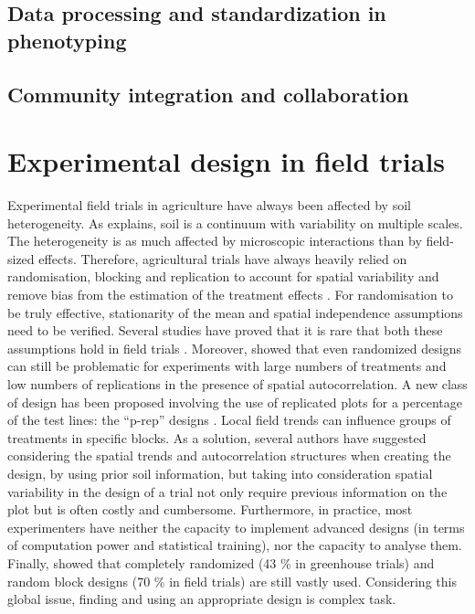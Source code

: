 \subsection{Data processing and standardization in phenotyping}
\subsection{Community integration and collaboration}


\section{Experimental design in field trials}
Experimental field trials in agriculture have always been affected by soil heterogeneity. As \textcite{van_es_1.2_2002} explains, soil is a continuum with variability on multiple scales. 
The heterogeneity is as much affected by microscopic interactions than by field-sized effects. 
Therefore, agricultural trials have always heavily relied on randomisation, blocking and replication to account for spatial variability and remove bias from the estimation of the treatment effects \parencite{atkinson_one_2001}. 
For randomisation to be truly effective, stationarity of the mean and spatial independence assumptions need to be verified. Several studies have proved that it is rare that both these assumptions hold in field trials \parencite{davidoff_method_1986,nielsen_spatial_1973,iqbal_spatial_2005}. 
Moreover, \textcite{van_es_spatial_1993} showed that even randomized designs can still be problematic for experiments with large numbers of treatments and low numbers of replications in the presence of spatial autocorrelation. A new class of design has been proposed involving the use of replicated plots for a percentage of the test lines: the “p-rep” designs \parencite{cullis_design_2006,velazco_modelling_2017}.
Local field trends can influence groups of treatments in specific blocks. As a solution, several authors \parencite{watson_spatial_2000,fagroud_accounting_2002} have suggested considering the spatial trends and autocorrelation structures when creating the design, by using prior soil information, but taking into consideration spatial variability in the design of a trial not only require previous information on the plot but is often costly and cumbersome. 
Furthermore, in practice, most experimenters have neither the capacity to implement advanced designs (in terms of computation power and statistical training), nor the capacity to analyse them. 
Finally, \textcite{van_es_spatially-balanced_2007} showed that completely randomized (43 \% in greenhouse trials) and random block designs (70 \% in field trials) are still vastly used.
Considering this global issue, finding and using an appropriate design is complex task.

